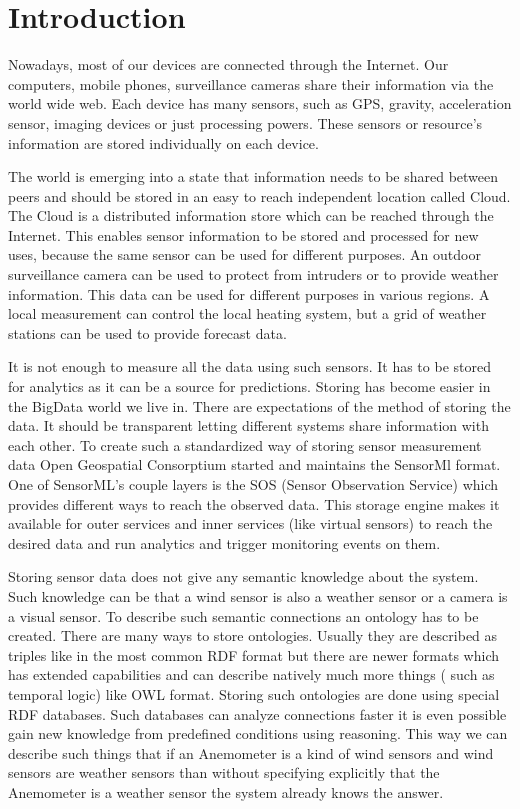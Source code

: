 \chapter*{Introduction}

Nowadays, most of our devices are connected through the Internet. Our computers, mobile phones, surveillance cameras share their information via the world wide web. Each device has many sensors, such as GPS, gravity, acceleration sensor, imaging devices or just processing powers. These sensors or resource's information are stored individually on each device. 

The world is emerging into a state that information needs to be shared between peers and should be stored in an easy to reach independent location called Cloud. The Cloud is a distributed information store which can be reached through the Internet.
This enables sensor information to be stored and processed for new uses, because the same sensor can be used for different purposes. An outdoor surveillance camera can be used to protect from intruders or to provide weather information. This data can be used for different purposes in various regions. A local measurement can control the local heating system, but a grid of weather stations can be used to provide forecast data.
 
 It is not enough to measure all the data using such sensors. It has to be stored for analytics as it can be a source for predictions. Storing has become easier in the BigData world we live in. There are expectations of the method of storing the data. It should be transparent letting different systems share information with each other. To create such a standardized way of storing sensor measurement data Open Geospatial Consorptium started and maintains the SensorMl format. One of SensorML's couple layers is the SOS (Sensor Observation Service) which provides different ways to reach the observed data. This storage engine makes it available for outer services and inner services (like virtual sensors) to reach the desired data and run analytics and trigger monitoring events on them.

Storing sensor data does not give any semantic knowledge about the system. Such knowledge can be that a wind sensor is also a weather sensor or a camera is a visual sensor. To describe such semantic connections an ontology has to be created. There are many ways to store ontologies. Usually they are described as triples like in the most common RDF format but there are newer formats which has extended capabilities and can describe natively much more things ( such as temporal logic) like OWL format. Storing such ontologies are done using special RDF databases. Such databases can analyze connections faster it is even possible gain new knowledge from predefined conditions using reasoning. This way we can describe such things that if an Anemometer is a kind of wind sensors and wind sensors are weather sensors than without specifying explicitly that the Anemometer is a weather sensor the system already knows the answer. 

